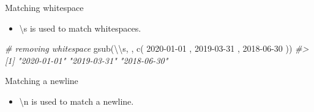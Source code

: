 \documentclass[
]{book}
\newenvironment{Shaded}{\begin{snugshade}}{\end{snugshade}}
\newcommand{\CommentTok}[1]{\textcolor[rgb]{0.56,0.35,0.01}{\textit{#1}}}
\newcommand{\FunctionTok}[1]{\textcolor[rgb]{0.00,0.00,0.00}{#1}}
\newcommand{\NormalTok}[1]{#1}
\newcommand{\SpecialCharTok}[1]{\textcolor[rgb]{0.00,0.00,0.00}{#1}}
\newcommand{\StringTok}[1]{\textcolor[rgb]{0.31,0.60,0.02}{#1}}
\providecommand{\tightlist}{%
  \setlength{\itemsep}{0pt}\setlength{\parskip}{0pt}}
\begin{document}
Matching whitespace

\begin{itemize}
\tightlist
\item
  \textbackslash s is used to match whitespaces.
\end{itemize}

\begin{Shaded}
\begin{Highlighting}[]
\CommentTok{\# removing whitespace}
\FunctionTok{gsub}\NormalTok{(}\StringTok{\textquotesingle{}}\SpecialCharTok{\textbackslash{}\textbackslash{}}\StringTok{s\textquotesingle{}}\NormalTok{, }\StringTok{\textquotesingle{}\textquotesingle{}}\NormalTok{, }\FunctionTok{c}\NormalTok{(}\StringTok{\textquotesingle{} 2020{-}01{-}01 \textquotesingle{}}\NormalTok{, }\StringTok{\textquotesingle{} 2019{-}03{-}31 \textquotesingle{}}\NormalTok{, }\StringTok{\textquotesingle{} 2018{-}06{-}30 \textquotesingle{}}\NormalTok{))}
\CommentTok{\#\textgreater{} [1] "2020{-}01{-}01" "2019{-}03{-}31" "2018{-}06{-}30"}
\end{Highlighting}
\end{Shaded}

Matching a newline

\begin{itemize}
\tightlist
\item
  \textbackslash n is used to match a newline.
\end{itemize}
\end{document}
